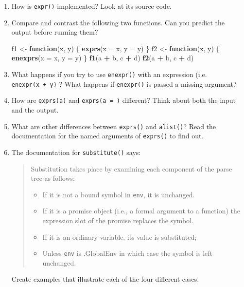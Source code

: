 \documentclass[]{book}
\newenvironment{Shaded}{\begin{snugshade}}{\end{snugshade}}
\newcommand{\ControlFlowTok}[1]{\textcolor[rgb]{0.27,0.27,0.27}{\textbf{#1}}}
\newcommand{\DataTypeTok}[1]{\textcolor[rgb]{0.27,0.27,0.27}{#1}}
\newcommand{\KeywordTok}[1]{\textcolor[rgb]{0.27,0.27,0.27}{\textbf{#1}}}
\newcommand{\NormalTok}[1]{#1}
\newcommand{\OperatorTok}[1]{\textcolor[rgb]{0.43,0.43,0.43}{\textbf{#1}}}
\newcommand{\StringTok}[1]{\textcolor[rgb]{0.5,0.5,0.5}{#1}}
\providecommand{\tightlist}{%
  \setlength{\itemsep}{0pt}\setlength{\parskip}{0pt}}
\begin{document}
\begin{enumerate}
\def\labelenumi{\arabic{enumi}.}
\item
  How is \texttt{expr()} implemented? Look at its source code.
\item
  Compare and contrast the following two functions. Can you predict the
  output before running them?

\begin{Shaded}
\begin{Highlighting}[]
\NormalTok{f1 <-}\StringTok{ }\ControlFlowTok{function}\NormalTok{(x, y) \{}
  \KeywordTok{exprs}\NormalTok{(}\DataTypeTok{x =}\NormalTok{ x, }\DataTypeTok{y =}\NormalTok{ y)}
\NormalTok{\}}
\NormalTok{f2 <-}\StringTok{ }\ControlFlowTok{function}\NormalTok{(x, y) \{}
  \KeywordTok{enexprs}\NormalTok{(}\DataTypeTok{x =}\NormalTok{ x, }\DataTypeTok{y =}\NormalTok{ y)}
\NormalTok{\}}
\KeywordTok{f1}\NormalTok{(a }\OperatorTok{+}\StringTok{ }\NormalTok{b, c }\OperatorTok{+}\StringTok{ }\NormalTok{d)}
\KeywordTok{f2}\NormalTok{(a }\OperatorTok{+}\StringTok{ }\NormalTok{b, c }\OperatorTok{+}\StringTok{ }\NormalTok{d)}
\end{Highlighting}
\end{Shaded}
\item
  What happens if you try to use \texttt{enexpr()} with an expression (i.e.
  \texttt{enexpr(x\ +\ y)} ? What happens if \texttt{enexpr()} is passed a missing argument?
\item
  How are \texttt{exprs(a)} and \texttt{exprs(a\ =\ )} different? Think about both the
  input and the output.
\item
  What are other differences between \texttt{exprs()} and \texttt{alist()}? Read the
  documentation for the named arguments of \texttt{exprs()} to find out.
\item
  The documentation for \texttt{substitute()} says:

  \begin{quote}
  Substitution takes place by examining each component of the parse tree
  as follows:

  \begin{itemize}
  \tightlist
  \item
    If it is not a bound symbol in \texttt{env}, it is unchanged.
  \item
    If it is a promise object (i.e., a formal argument to a function)
    the expression slot of the promise replaces the symbol.
  \item
    If it is an ordinary variable, its value is substituted;
  \item
    Unless \texttt{env} is .GlobalEnv in which case the symbol is left
    unchanged.
  \end{itemize}
  \end{quote}

  Create examples that illustrate each of the four different cases.
\end{enumerate}
\end{document}
